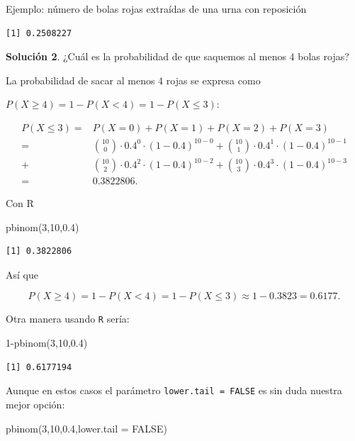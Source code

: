 \documentclass[
  letterpaper,
  DIV=11,
  numbers=noendperiod]{scrreprt}
\newenvironment{Shaded}{\begin{snugshade}}{\end{snugshade}}
\newcommand{\AttributeTok}[1]{\textcolor[rgb]{0.40,0.45,0.13}{#1}}
\newcommand{\ConstantTok}[1]{\textcolor[rgb]{0.56,0.35,0.01}{#1}}
\newcommand{\DecValTok}[1]{\textcolor[rgb]{0.68,0.00,0.00}{#1}}
\newcommand{\FloatTok}[1]{\textcolor[rgb]{0.68,0.00,0.00}{#1}}
\newcommand{\FunctionTok}[1]{\textcolor[rgb]{0.28,0.35,0.67}{#1}}
\newcommand{\NormalTok}[1]{\textcolor[rgb]{0.00,0.23,0.31}{#1}}
\newcommand{\SpecialCharTok}[1]{\textcolor[rgb]{0.37,0.37,0.37}{#1}}
\begin{document}
\begin{Ejemplo}{Ejemplo: número de bolas rojas extraídas de una urna con reposición}{}
\begin{verbatim}
[1] 0.2508227
\end{verbatim}

\textbf{Solución 2}. ¿Cuál es la probabilidad de que saquemos al menos
\(4\) bolas rojas?

La probabilidad de sacar al menos 4 rojas se expresa como

\(P(X \geq 4)=1-P(X<4)=1-P(X\leq 3):\)

\begin{align*}
P(X\leq 3)=& P(X=0)+P(X=1)+P(X=2)+P(X=3)\\
=& 
 {10\choose 0}\cdot 0.4^0\cdot (1-0.4)^{10-0}+ {10\choose 1}\cdot 0.4^1\cdot (1-0.4)^{10-1}\\
+&{10\choose 2}\cdot 0.4^2\cdot (1-0.4)^{10-2}+ {10\choose 3}\cdot 0.4^3\cdot (1-0.4)^{10-3}\\
=&0.3822806.
\end{align*}

Con R

\begin{Shaded}
\begin{Highlighting}[]
\FunctionTok{pbinom}\NormalTok{(}\DecValTok{3}\NormalTok{,}\DecValTok{10}\NormalTok{,}\FloatTok{0.4}\NormalTok{)}
\end{Highlighting}
\end{Shaded}

\begin{verbatim}
[1] 0.3822806
\end{verbatim}

Así que

\[P(X \geq 4 )=1-P(X< 4)=1-P(X\leq 3)\approx 1-0.3823=0.6177.\]

Otra manera usando \texttt{R} sería:

\begin{Shaded}
\begin{Highlighting}[]
\DecValTok{1}\SpecialCharTok{{-}}\FunctionTok{pbinom}\NormalTok{(}\DecValTok{3}\NormalTok{,}\DecValTok{10}\NormalTok{,}\FloatTok{0.4}\NormalTok{)}
\end{Highlighting}
\end{Shaded}

\begin{verbatim}
[1] 0.6177194
\end{verbatim}

Aunque en estos casos el parámetro \texttt{lower.tail\ =\ FALSE} es sin
duda nuestra mejor opción:

\begin{Shaded}
\begin{Highlighting}[]
\FunctionTok{pbinom}\NormalTok{(}\DecValTok{3}\NormalTok{,}\DecValTok{10}\NormalTok{,}\FloatTok{0.4}\NormalTok{,}\AttributeTok{lower.tail =} \ConstantTok{FALSE}\NormalTok{)}
\end{Highlighting}
\end{Shaded}


\end{Ejemplo}
\end{document}
